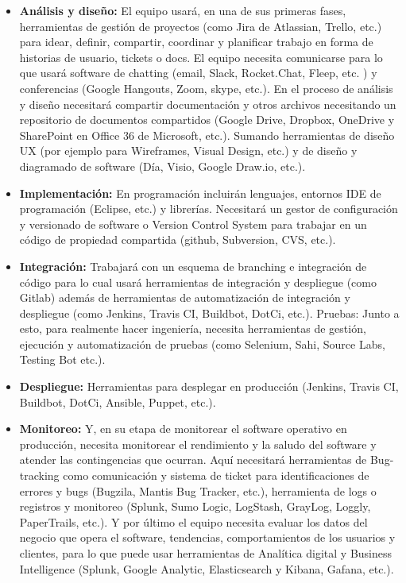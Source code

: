 \begin{itemize}

\item \textbf{Análisis y diseño:} El equipo usará, en una de sus primeras fases, herramientas de gestión de proyectos (como Jira de Atlassian, Trello, etc.) para idear, definir, compartir, coordinar y planificar trabajo en forma de historias de usuario, tickets o docs. El equipo necesita comunicarse para lo que usará software de chatting (email, Slack, Rocket.Chat, Fleep, etc. ) y conferencias (Google Hangouts, Zoom, skype, etc.). En el proceso de análisis y diseño necesitará compartir documentación y otros archivos necesitando un repositorio de documentos compartidos (Google Drive, Dropbox, OneDrive y SharePoint en Office 36 de Microsoft, etc.). Sumando herramientas de diseño UX (por ejemplo para Wireframes, Visual Design, etc.) y de diseño y diagramado de software (Día, Visio, Google Draw.io, etc.). 

\item \textbf{Implementación:} En programación incluirán lenguajes, entornos IDE de programación (Eclipse, etc.) y librerías. Necesitará un gestor de configuración y versionado de software o Version Control System para trabajar en un código de propiedad compartida (github, Subversion, CVS, etc.). 

\item \textbf{Integración:} Trabajará con un esquema de branching e integración de código para lo cual usará herramientas de integración y despliegue (como Gitlab) además de herramientas de automatización de integración y despliegue (como Jenkins, Travis CI, Buildbot, DotCi, etc.). 
Pruebas: Junto a esto, para realmente hacer ingeniería, necesita herramientas de gestión,  ejecución y automatización de pruebas (como Selenium, Sahi, Source Labs, Testing Bot etc.). 

\item \textbf{Despliegue:} Herramientas para desplegar en producción (Jenkins, Travis CI, Buildbot, DotCi, Ansible, Puppet, etc.). 

\item \textbf{Monitoreo:} Y, en su etapa de monitorear el software operativo en producción, necesita monitorear el rendimiento y la saludo del software y atender las contingencias que ocurran. Aquí necesitará herramientas de Bug-tracking como comunicación y sistema de ticket para identificaciones de errores y bugs (Bugzila, Mantis Bug Tracker, etc.), herramienta de logs o  registros y monitoreo (Splunk, Sumo Logic, LogStash, GrayLog, Loggly, PaperTrails, etc.). Y por último el equipo necesita evaluar los datos del negocio que opera el software, tendencias, comportamientos de los usuarios y clientes, para lo que puede usar herramientas de Analítica digital y Business Intelligence (Splunk, Google Analytic, Elasticsearch y Kibana, Gafana, etc.).

\end{itemize}

